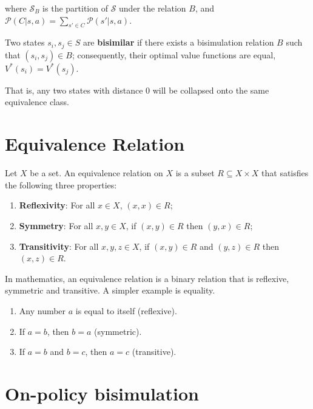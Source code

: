 where $\mathcal{S}_B$ is the partition of $\mathcal{S}$ under the relation $B$, and $\mathcal{P}(C|s, a) = \sum_{s' \in C} \mathcal{P}(s'|s, a)$.

Two states $s_i, s_j \in S$ are \textbf{bisimilar} if there exists a bisimulation relation $B$ such that $(s_i, s_j) \in B$; consequently, their optimal value functions are equal, \(V^\ast(s_i) = V^\ast(s_j)\).




That is, any two states with distance 0 will be collapsed onto the same equivalence class.



\section{Equivalence Relation}

\begin{definition}
Let $X$ be a set. An equivalence relation on $X$ is a subset $R \subseteq X \times X$ that satisfies the following three properties:
\begin{enumerate}
    \item \textbf{Reflexivity}: For all $x \in X$, $(x,x) \in R$;
    \item \textbf{Symmetry}: For all $x, y \in X$, if $(x,y) \in R$ then $(y,x) \in R$;
    \item \textbf{Transitivity}: For all $x, y, z \in X$, if $(x,y) \in R$ and $(y,z) \in R$ then $(x,z) \in R$.
\end{enumerate}
\end{definition}

In mathematics, an equivalence relation is a binary relation that is reflexive, symmetric and transitive. A simpler example is equality. 

\begin{enumerate}
    \item Any number $a$ is equal to itself (reflexive).
    \item  If $a=b$, then $b=a$ (symmetric).
    \item If $a=b$ and $b=c$, then $a=c$ (transitive). 
\end{enumerate}



\section{On-policy bisimulation}

